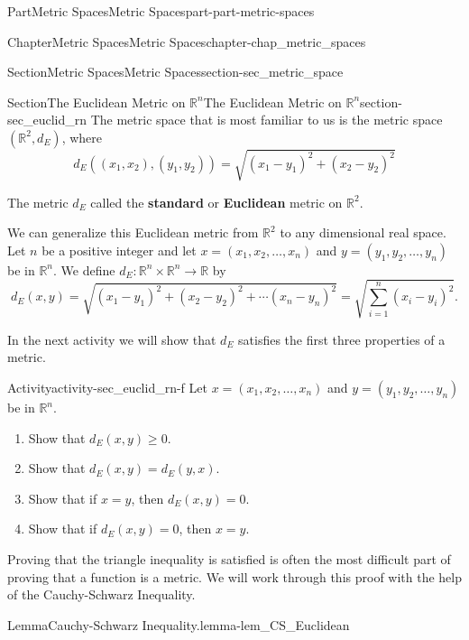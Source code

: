 \documentclass[oneside,10pt,]{book}
\newcommand{\terminology}[1]{\textbf{#1}}
\numberwithin{equation}{chapter}
\newcommand{\R}{\mathbb{R}}
\begin{document}
\begin{partptx}{Part}{Metric Spaces}{}{Metric Spaces}{}{}{part-part-metric-spaces}
\begin{chapterptx}{Chapter}{Metric Spaces}{}{Metric Spaces}{}{}{chapter-chap_metric_spaces}
\begin{sectionptx}{Section}{Metric Spaces}{}{Metric Spaces}{}{}{section-sec_metric_space}
\end{sectionptx}
%
%
\typeout{************************************************}
\typeout{Section  The Euclidean Metric on \(\R^n\)}
\typeout{************************************************}
%
\begin{sectionptx}{Section}{The Euclidean Metric on \(\R^n\)}{}{The Euclidean Metric on \(\R^n\)}{}{}{section-sec_euclid_rn}
The metric space that is most familiar to us is the metric space \((\R^2, d_E)\), where%
\begin{equation*}
d_E((x_1,x_2), (y_1,y_2)) = \sqrt{(x_1-y_1)^2 + (x_2-y_2)^2}
\end{equation*}
%
\par
{} The metric \(d_E\) called the \terminology{standard} or \terminology{Euclidean} metric on \(\R^2\).%
\par
We can generalize this Euclidean metric from \(\R^2\) to any dimensional real space. Let \(n\) be a positive integer and let \(x = (x_1, x_2, \ldots,
x_n)\) and \(y = (y_1, y_2, \ldots,
y_n)\) be in \(\R^n\). We define \(d_E : \R^n \times \R^n \to \R\) by%
\begin{equation*}
d_E(x,y) = \sqrt{(x_1-y_1)^2 + (x_2-y_2)^2 + \cdots (x_n-y_n)^2} = \sqrt{\sum_{i=1}^n (x_i-y_i)^2}\text{.}
\end{equation*}
%
\par
In the next activity we will show that \(d_E\) satisfies the first three properties of a metric.%
\begin{activity}{Activity}{}{activity-sec_euclid_rn-f}%
Let \(x = (x_1, x_2, \ldots,
x_n)\) and \(y = (y_1, y_2, \ldots,
y_n)\) be in \(\R^n\).%
\begin{enumerate}[font=\bfseries,label=(\alph*),ref=\alph*]%
\item{}Show that \(d_E(x,y) \geq 0\).%
\item{}Show that \(d_E(x,y) = d_E(y,x)\).%
\item{}Show that if \(x=y\), then \(d_E(x,y) = 0\).%
\item{}Show that if \(d_E(x,y) = 0\), then \(x=y\).%
\end{enumerate}%
\end{activity}%
Proving that the triangle inequality is satisfied is often the most difficult part of proving that a function is a metric. We will work through this proof with the help of the Cauchy-Schwarz Inequality.%
\begin{lemma}{Lemma}{Cauchy-Schwarz Inequality.}{}{lemma-lem_CS_Euclidean}%
%

\end{lemma}
\end{sectionptx}
\end{chapterptx}
\end{partptx}
\end{document}
